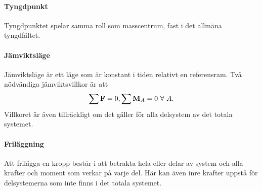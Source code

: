 \paragraph{Tyngdpunkt}
Tyngdpunktet spelar samma roll som masscentrum, fast i det allmäna tyngdfältet.

\paragraph{Jämviktsläge}
Jämviktsläge är ett läge som är konstant i tiden relativt en referensram. Två nödvändiga jämviktsvillkor är att
\begin{align*}
	\sum\vect{F} = 0, \sum\vect{M}_A = 0 \ \forall\ A.
\end{align*}
Villkoret är även tillräckligt om det gäller för alla delsystem av det totala systemet.

\paragraph{Friläggning}
Att frilägga en kropp består i att betrakta hela eller delar av system och alla krafter och moment som verkar på varje del. Här kan även inre krafter uppstå för delsystemerna som inte finns i det totala systemet.